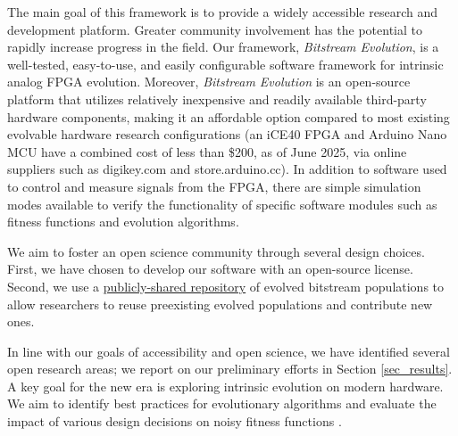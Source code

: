 \documentclass{ieeeaccess}
\newcommand{\highlight}[1]{#1}
\begin{document}
The main goal of this framework is to provide a widely accessible research and development platform. %
Greater community involvement has the potential to rapidly increase progress in the field. Our framework, \textit{Bitstream Evolution}, is a well-tested, easy-to-use, and easily configurable software framework for intrinsic analog FPGA evolution. 
Moreover, \textit{Bitstream Evolution} is an open-source platform that utilizes relatively inexpensive and readily available \highlight{third-party} hardware components, making it an affordable option compared to most existing evolvable hardware research configurations (an iCE40 FPGA and Arduino Nano MCU have a combined cost of less than \$200, as of \highlight{June 2025}, via online suppliers such as digikey.com and store.arduino.cc).
In addition to software used to control and measure signals from the FPGA, there are simple simulation modes available to verify the functionality of specific software modules such as fitness functions and evolution algorithms.



We aim to foster an open science community through several design choices. First, we have chosen to develop our software with an open-source license. Second, we use a \href{https://github.com/evolvablehardware/BitstreamEvolutionPopulations}{publicly-shared repository} of evolved bitstream populations to allow researchers to reuse preexisting evolved populations and contribute new ones. 

  

 

In line with our goals of accessibility and open science, we have identified several open research areas; we report on our preliminary efforts in Section \ref{sec_results}. %
A key goal for the new era is exploring intrinsic evolution on modern hardware. We aim to identify best practices for evolutionary algorithms and evaluate the impact of various design decisions on noisy fitness functions \cite{Dang2015EfficientAlgorithms}.
\end{document}

